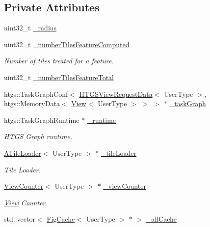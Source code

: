 \subsection*{Private Attributes}
\begin{DoxyCompactItemize}
\item 
uint32\+\_\+t \hyperlink{classfi_1_1FastImage_a1ebd8ba4863bd2c0e1a2a3df6469dc27}{\+\_\+radius}
\item 
uint32\+\_\+t \hyperlink{classfi_1_1FastImage_a517076aaa824901ca1e14b00a934be54}{\+\_\+number\+Tiles\+Feature\+Computed}
\begin{DoxyCompactList}\small\item\em Number of tiles treated for a feature. \end{DoxyCompactList}\item 
uint32\+\_\+t \hyperlink{classfi_1_1FastImage_a24f06aeefc60764d9cf261417420d92a}{\+\_\+number\+Tiles\+Feature\+Total}
\item 
htgs\+::\+Task\+Graph\+Conf$<$ \hyperlink{classfi_1_1HTGSViewRequestData}{H\+T\+G\+S\+View\+Request\+Data}$<$ User\+Type $>$, htgs\+::\+Memory\+Data$<$ \hyperlink{classfi_1_1View}{View}$<$ User\+Type $>$ $>$ $>$ $\ast$ \hyperlink{classfi_1_1FastImage_af3d88915c813b26921a6e329f1880b20}{\+\_\+task\+Graph}
\item 
htgs\+::\+Task\+Graph\+Runtime $\ast$ \hyperlink{classfi_1_1FastImage_abff349ecfa318ce51929691878d9230d}{\+\_\+runtime}
\begin{DoxyCompactList}\small\item\em H\+T\+GS Graph runtime. \end{DoxyCompactList}\item 
\hyperlink{classfi_1_1ATileLoader}{A\+Tile\+Loader}$<$ User\+Type $>$ $\ast$ \hyperlink{classfi_1_1FastImage_ae2b26c6fbdedf4f23ddf57f1b95828ab}{\+\_\+tile\+Loader}
\begin{DoxyCompactList}\small\item\em Tile Loader. \end{DoxyCompactList}\item 
\hyperlink{classfi_1_1ViewCounter}{View\+Counter}$<$ User\+Type $>$ $\ast$ \hyperlink{classfi_1_1FastImage_ab93b796420eb2bbd6263dff2294be1d7}{\+\_\+view\+Counter}
\begin{DoxyCompactList}\small\item\em \hyperlink{classfi_1_1View}{View} Counter. \end{DoxyCompactList}\item 
std\+::vector$<$ \hyperlink{classfi_1_1FigCache}{Fig\+Cache}$<$ User\+Type $>$ $\ast$ $>$ \hyperlink{classfi_1_1FastImage_aea01a1147574f77e4f656e5f0525236b}{\+\_\+all\+Cache}

\end{DoxyCompactItemize}
